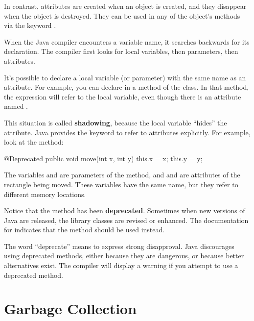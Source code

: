 
In contrast, attributes are created when an object is created, and they disappear when the object is destroyed.
They can be used in any of the object's methods via the keyword .

When the Java compiler encounters a variable name, it searches backwards for its declaration.
The compiler first looks for local variables, then parameters, then attributes.


It's possible to declare a local variable (or parameter) with the same name as an attribute.
For example, you can declare  in a method of the  class.
In that method, the expression  will refer to the local variable, even though there is an attribute named .


This situation is called {\bf shadowing}, because the local variable ``hides'' the attribute.
Java provides the keyword  to refer to attributes explicitly.
For example, look at the  method:

\begin{code}
@Deprecated
public void move(int x, int y) {
    this.x = x;
    this.y = y;
}
\end{code}

The variables  and  are parameters of the  method, and  and  are attributes of the rectangle being moved.
These variables have the same name, but they refer to different memory locations.


Notice that the  method has been {\bf deprecated}.
Sometimes when new versions of Java are released, the library classes are revised or enhanced.
The documentation for  indicates that the  method should be used instead.

The word ``deprecate'' means to express strong disapproval.
Java discourages using deprecated methods, either because they are dangerous, or because better alternatives exist.
The compiler will display a warning if you attempt to use a deprecated method.


\section{Garbage Collection}

